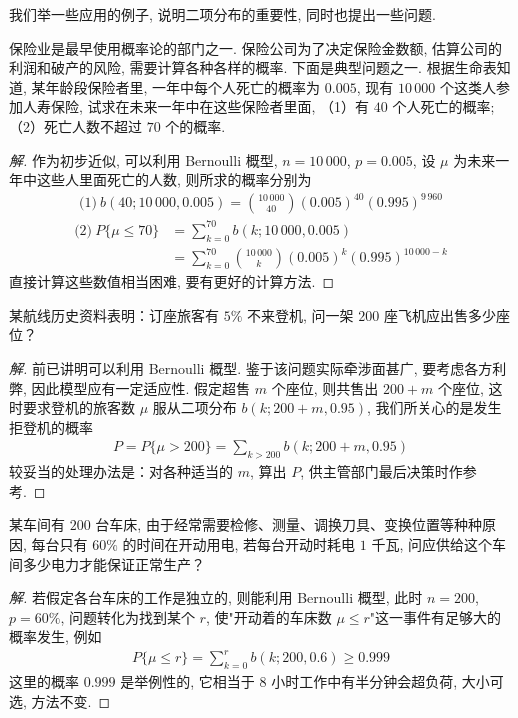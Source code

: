\documentclass[../../main.tex]{subfiles}
\begin{document}
我们举一些应用的例子, 说明二项分布的重要性, 同时也提出一些问题.

\begin{example}[人寿保险]\label{example:ch02-人寿保险}
保险业是最早使用概率论的部门之一. 保险公司为了决定保险金数额, 估算公司的利润和破产的风险, 需要计算各种各样的概率. 下面是典型问题之一. 根据生命表知道, 某年龄段保险者里, 一年中每个人死亡的概率为 $0.005$, 现有 $10\,000$ 个这类人参加人寿保险, 试求在未来一年中在这些保险者里面, （1）有 $40$ 个人死亡的概率; （2）死亡人数不超过 $70$ 个的概率.

\begin{proof}[解]
作为初步近似, 可以利用 Bernoulli 概型, $n=10\,000$, $p=0.005$, 设 $\mu$ 为未来一年中这些人里面死亡的人数, 则所求的概率分别为
\begin{align}\label{align:ch02-人寿保险1}
\text{(1)}\ b(40;10\,000,0.005)=\binom{10\,000}{40}(0.005)^{40}(0.995)^{9\,960}
\end{align}
\begin{align}\label{align:ch02-人寿保险2}
\text{(2)}\ P\{\mu\leqslant 70\}&=\sum_{k=0}^{70} b(k;10\,000,0.005)\\
&=\sum_{k=0}^{70}\binom{10\,000}{k}(0.005)^k(0.995)^{10\,000-k}\nonumber
\end{align}
直接计算这些数值相当困难, 要有更好的计算方法.
\end{proof}
\end{example}

\begin{example}[机票超售]\label{example:ch02-机票超售}
某航线历史资料表明：订座旅客有 $5\%$ 不来登机, 问一架 $200$ 座飞机应出售多少座位？

\begin{proof}[解]
前已讲明可以利用 Bernoulli 概型. 鉴于该问题实际牵涉面甚广, 要考虑各方利弊, 因此模型应有一定适应性. 假定超售 $m$ 个座位, 则共售出 $200+m$ 个座位, 这时要求登机的旅客数 $\mu$ 服从二项分布 $b(k;200+m,0.95)$, 我们所关心的是发生拒登机的概率
\begin{align*}
P=P\{\mu>200\}=\sum_{k>200} b(k;200+m,0.95)
\end{align*}
较妥当的处理办法是：对各种适当的 $m$, 算出 $P$, 供主管部门最后决策时作参考.
\end{proof}
\end{example}

\begin{example}[车间用电]\label{example:ch02-车间用电}
某车间有 $200$ 台车床, 由于经常需要检修、测量、调换刀具、变换位置等种种原因, 每台只有 $60\%$ 的时间在开动用电, 若每台开动时耗电 $1$ 千瓦, 问应供给这个车间多少电力才能保证正常生产？

\begin{proof}[解]
若假定各台车床的工作是独立的, 则能利用 Bernoulli 概型, 此时 $n=200$, $p=60\%$, 问题转化为找到某个 $r$, 使"开动着的车床数 $\mu\leqslant r$"这一事件有足够大的概率发生, 例如
\begin{align}\label{align:ch02-车间用电}
P\{\mu\leqslant r\}=\sum_{k=0}^{r} b(k;200,0.6)\geqslant 0.999
\end{align}
这里的概率 $0.999$ 是举例性的, 它相当于 $8$ 小时工作中有半分钟会超负荷, 大小可选, 方法不变.
\end{proof}
\end{example}
\end{document}
